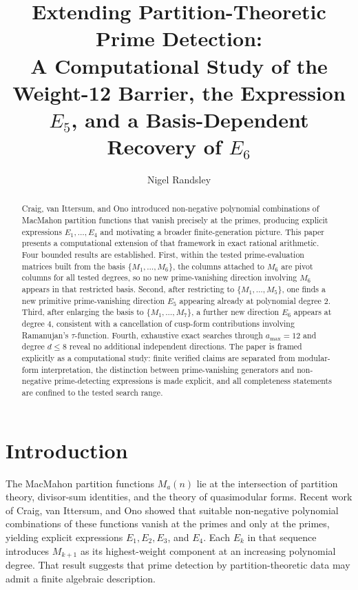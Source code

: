 \documentclass[11pt]{article}
\title{Extending Partition-Theoretic Prime Detection:\\
A Computational Study of the Weight-12 Barrier,
the Expression $E_5$, and a Basis-Dependent Recovery of $E_6$}
\author{Nigel Randsley}
\date{}
\begin{document}
\maketitle

\begin{abstract}
Craig, van Ittersum, and Ono \cite{CIO2024} introduced non-negative polynomial combinations
of MacMahon partition functions that vanish precisely at the primes, producing explicit
expressions $E_1,\dots,E_4$ and motivating a broader finite-generation picture.
This paper presents a computational extension of that framework in exact rational arithmetic.
Four bounded results are established.
First, within the tested prime-evaluation matrices built from the basis $\{M_1,\dots,M_6\}$,
the columns attached to $M_6$ are pivot columns for all tested degrees, so no new
prime-vanishing direction involving $M_6$ appears in that restricted basis.
Second, after restricting to $\{M_1,\dots,M_5\}$, one finds a new primitive prime-vanishing
direction $E_5$ appearing already at polynomial degree $2$.
Third, after enlarging the basis to $\{M_1,\dots,M_7\}$, a further new direction $E_6$
appears at degree $4$, consistent with a cancellation of cusp-form contributions involving
Ramanujan's $\tau$-function.
Fourth, exhaustive exact searches through $a_{\max}=12$ and degree $d\le 8$ reveal no
additional independent directions.
The paper is framed explicitly as a computational study: finite verified claims are separated
from modular-form interpretation, the distinction between prime-vanishing generators and
non-negative prime-detecting expressions is made explicit, and all completeness statements
are confined to the tested search range.
\end{abstract}

\section{Introduction}
\label{sec:intro}

The MacMahon partition functions $M_a(n)$ lie at the intersection of partition theory,
divisor-sum identities, and the theory of quasimodular forms.
Recent work of Craig, van Ittersum, and Ono \cite{CIO2024} showed that suitable non-negative
polynomial combinations of these functions vanish at the primes and only at the primes,
yielding explicit expressions $E_1,E_2,E_3$, and $E_4$.
Each $E_k$ in that sequence introduces $M_{k+1}$ as its highest-weight component at an
increasing polynomial degree.
That result suggests that prime detection by partition-theoretic data may admit a finite
algebraic description.
\end{document}
